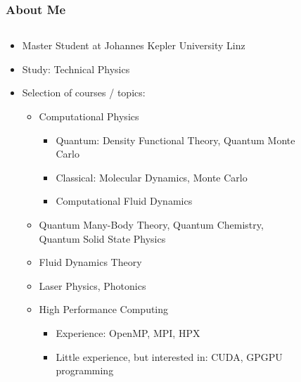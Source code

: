 \documentclass[9pt, english]{beamer}
\begin{document}
\begin{frame}
\frametitle{About Me}
\begin{columns}[t]
\begin{column}{0.65\textwidth}
\vspace{-0.25cm}
\begin{itemize}
 \item Master Student at Johannes Kepler University Linz
 \item Study: Technical Physics
 \item Selection of courses / topics:
  \begin{itemize}
  \item Computational Physics 
  \begin{itemize}
   \item Quantum: Density Functional Theory, Quantum Monte Carlo
   \item Classical: Molecular Dynamics, Monte Carlo
   \item Computational Fluid Dynamics
  \end{itemize}
  \item Quantum Many-Body Theory, Quantum Chemistry, Quantum Solid State Physics
  \item Fluid Dynamics Theory
  \item Laser Physics, Photonics
  \item High Performance Computing
  \begin{itemize}
   \item Experience: OpenMP, MPI, HPX
   \item Little experience, but interested in: CUDA, GPGPU programming
  \end{itemize}
 \end{itemize}
\end{itemize}
\end{column}
\begin{column}{0.35\textwidth}
\begin{figure}
\centering

\end{figure}
\end{column}
\end{columns}
\end{frame}
\end{document}
